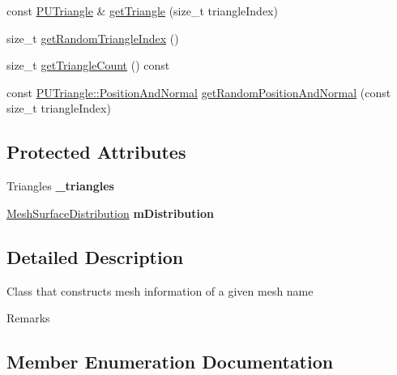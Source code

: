 \begin{DoxyCompactItemize}
\item 
const \hyperlink{classPUTriangle}{P\+U\+Triangle} \& \hyperlink{classMeshInfo_ac99e33607524d3122b2545f85f52aa16}{get\+Triangle} (size\+\_\+t triangle\+Index)
\item 
size\+\_\+t \hyperlink{classMeshInfo_a7e3355c03d8c7e8147d563cac098094f}{get\+Random\+Triangle\+Index} ()
\item 
size\+\_\+t \hyperlink{classMeshInfo_a5e2ff519d1987d26101a6e40527a9571}{get\+Triangle\+Count} () const
\item 
const \hyperlink{structPUTriangle_1_1PositionAndNormal}{P\+U\+Triangle\+::\+Position\+And\+Normal} \hyperlink{classMeshInfo_aa4e919b45d5c74e273fe94b1ab44f385}{get\+Random\+Position\+And\+Normal} (const size\+\_\+t triangle\+Index)
\end{DoxyCompactItemize}
\subsection*{Protected Attributes}
\begin{DoxyCompactItemize}
\item 
\mbox{\label{classMeshInfo_aee40e4d44db7d89c8ad0dfab4022b17e}} 
Triangles {\bfseries \+\_\+triangles}
\item 
\mbox{\label{classMeshInfo_a20edf56a1e7c1d259ba425b419b1c6fa}} 
\hyperlink{classMeshInfo_aadc99105abbc3bd033e33c6ba512a13b}{Mesh\+Surface\+Distribution} {\bfseries m\+Distribution}
\end{DoxyCompactItemize}


\subsection{Detailed Description}
Class that constructs mesh information of a given mesh name \begin{DoxyRemark}{Remarks}

\end{DoxyRemark}


\subsection{Member Enumeration Documentation}
\mbox{\label{classMeshInfo_aadc99105abbc3bd033e33c6ba512a13b}} 
